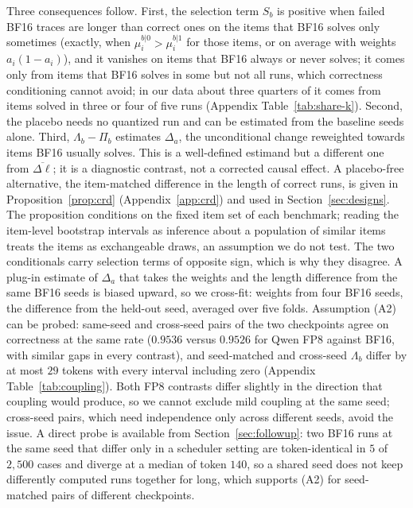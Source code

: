 \documentclass[11pt,a4paper]{article}
\begin{document}
Three consequences follow. First, the selection term $S_b$ is positive when failed BF16 traces are longer than correct ones on the items that BF16 solves only sometimes (exactly, when $\mu^{b|0}_i>\mu^{b|1}_i$ for those items, or on average with weights $a_i(1-a_i)$), and it vanishes on items that BF16 always or never solves; it comes only from items that BF16 solves in some but not all runs, which correctness conditioning cannot avoid; in our data about three quarters of it comes from items solved in three or four of five runs (Appendix Table~\ref{tab:share-k}). Second, the placebo needs no quantized run and can be estimated from the baseline seeds alone. Third, $\Lambda_b-\Pi_b$ estimates $\Delta_a$, the unconditional change reweighted towards items BF16 usually solves. This is a well-defined estimand but a different one from $\overline{\Delta\ell}$; it is a diagnostic contrast, not a corrected causal effect. A placebo-free alternative, the item-matched difference in the length of correct runs, is given in Proposition~\ref{prop:crd} (Appendix~\ref{app:crd}) and used in Section~\ref{sec:designs}. The proposition conditions on the fixed item set of each benchmark; reading the item-level bootstrap intervals as inference about a population of similar items treats the items as exchangeable draws, an assumption we do not test. The two conditionals carry selection terms of opposite sign, which is why they disagree. A plug-in estimate of $\Delta_a$ that takes the weights and the length difference from the same BF16 seeds is biased upward, so we cross-fit: weights from four BF16 seeds, the difference from the held-out seed, averaged over five folds. Assumption (A2) can be probed: same-seed and cross-seed pairs of the two checkpoints agree on correctness at the same rate ($0.9536$ versus $0.9526$ for Qwen FP8 against BF16, with similar gaps in every contrast), and seed-matched and cross-seed $\Lambda_b$ differ by at most $29$ tokens with every interval including zero (Appendix Table~\ref{tab:coupling}). Both FP8 contrasts differ slightly in the direction that coupling would produce, so we cannot exclude mild coupling at the same seed; cross-seed pairs, which need independence only across different seeds, avoid the issue. A direct probe is available from Section~\ref{sec:followup}: two BF16 runs at the same seed that differ only in a scheduler setting are token-identical in $5$ of $2{,}500$ cases and diverge at a median of token $140$, so a shared seed does not keep differently computed runs together for long, which supports (A2) for seed-matched pairs of different checkpoints.
\end{document}
